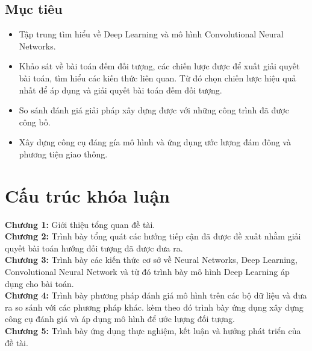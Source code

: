 \subsection{Mục tiêu}
\begin{itemize}
\item	Tập trung tìm hiểu về Deep Learning và mô hình Convolutional Neural Networks.
\item 	Khảo sát về bài toán đếm đối tượng, các chiến lược được để xuất giải quyết bài toán, tìm hiểu các kiến thức liên quan. Từ đó chọn chiến lược hiệu quả nhất để áp dụng và giải quyết bài toán đếm đối tượng. 
\item 	So sánh đánh giá giải pháp xây dựng được với những công trình đã được công bố.
\item	Xây dựng công cụ đáng gía mô hình và ứng dụng ước lượng đám đông và phương tiện giao thông.

\end{itemize}

\section{Cấu trúc khóa luận}
\textbf{Chương 1: } Giới thiệu tổng quan đề tài.
\\\textbf{Chương 2: } Trình bày tổng quát các hướng tiếp cận đã được đề xuất nhằm giải quyết bài toán hướng đối tượng đã được đưa ra. 
\\\textbf{Chương 3: } Trình bày các kiến thức cơ sở về Neural Networks, Deep Learning, Convolutional Neural Network và từ đó trình bày mô hình Deep Learning áp dụng cho bài toán.
\\\textbf{Chương 4: } Trình bày phương pháp đánh giá mô hình trên các bộ dữ liệu và đưa ra so sánh với các phương pháp khác. kèm theo đó trình bày ứng dụng xây dựng công cụ đánh giá và áp dụng mô hình để ước lượng đối tượng. 
\\\textbf{Chương 5: } Trình bày ứng dụng thực nghiệm, kết luận và hướng phát triển của đề tài.



